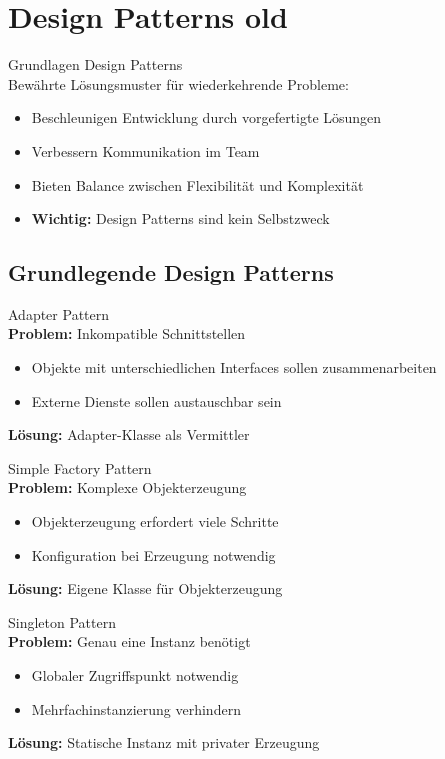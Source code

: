 \section{Design Patterns old}

\begin{concept}{Grundlagen Design Patterns}\\
Bewährte Lösungsmuster für wiederkehrende Probleme:
\begin{itemize}
    \item Beschleunigen Entwicklung durch vorgefertigte Lösungen
    \item Verbessern Kommunikation im Team
    \item Bieten Balance zwischen Flexibilität und Komplexität
    \item \textbf{Wichtig:} Design Patterns sind kein Selbstzweck
\end{itemize}
\end{concept}

\subsection{Grundlegende Design Patterns}

\begin{definition}{Adapter Pattern}\\
\textbf{Problem:} Inkompatible Schnittstellen
\begin{itemize}
    \item Objekte mit unterschiedlichen Interfaces sollen zusammenarbeiten
    \item Externe Dienste sollen austauschbar sein
\end{itemize}
\textbf{Lösung:} Adapter-Klasse als Vermittler
\end{definition}

\begin{definition}{Simple Factory Pattern}\\
\textbf{Problem:} Komplexe Objekterzeugung
\begin{itemize}
    \item Objekterzeugung erfordert viele Schritte
    \item Konfiguration bei Erzeugung notwendig
\end{itemize}
\textbf{Lösung:} Eigene Klasse für Objekterzeugung
\end{definition}

\begin{definition}{Singleton Pattern}\\
\textbf{Problem:} Genau eine Instanz benötigt
\begin{itemize}
    \item Globaler Zugriffspunkt notwendig
    \item Mehrfachinstanzierung verhindern
\end{itemize}
\textbf{Lösung:} Statische Instanz mit privater Erzeugung
\end{definition}

